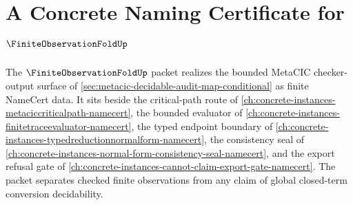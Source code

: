 \chapter{A Concrete Naming Certificate for $\FiniteObservationFoldUp$}
\label{ch:concrete-instances-finite-observation-fold-namecert}

The $\FiniteObservationFoldUp$ packet realizes the bounded MetaCIC checker-output surface of \autoref{sec:metacic-decidable-audit-map-conditional} as finite NameCert data. It sits beside the critical-path route of \autoref{ch:concrete-instances-metaciccriticalpath-namecert}, the bounded evaluator of \autoref{ch:concrete-instances-finitetraceevaluator-namecert}, the typed endpoint boundary of \autoref{ch:concrete-instances-typedreductionnormalform-namecert}, the consistency seal of \autoref{ch:concrete-instances-normal-form-consistency-seal-namecert}, and the export refusal gate of \autoref{ch:concrete-instances-cannot-claim-export-gate-namecert}. The packet separates checked finite observations from any claim of global closed-term conversion decidability.

